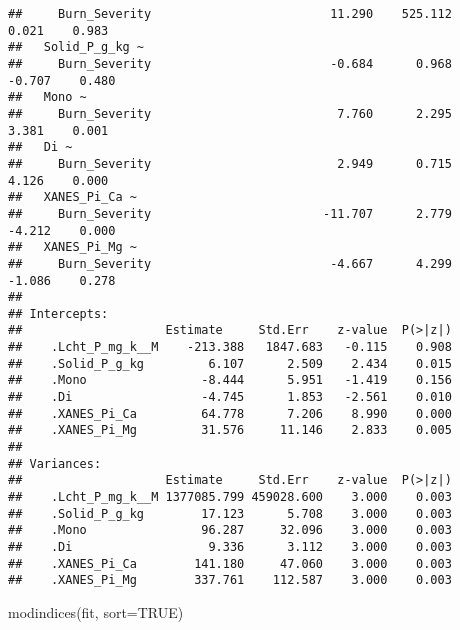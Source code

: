 \documentclass[
]{article}
\newenvironment{Shaded}{\begin{snugshade}}{\end{snugshade}}
\newcommand{\AttributeTok}[1]{\textcolor[rgb]{0.77,0.63,0.00}{#1}}
\newcommand{\ConstantTok}[1]{\textcolor[rgb]{0.00,0.00,0.00}{#1}}
\newcommand{\FunctionTok}[1]{\textcolor[rgb]{0.00,0.00,0.00}{#1}}
\newcommand{\NormalTok}[1]{#1}
\begin{document}
\begin{verbatim}
##     Burn_Severity                         11.290    525.112    0.021    0.983
##   Solid_P_g_kg ~                                                             
##     Burn_Severity                         -0.684      0.968   -0.707    0.480
##   Mono ~                                                                     
##     Burn_Severity                          7.760      2.295    3.381    0.001
##   Di ~                                                                       
##     Burn_Severity                          2.949      0.715    4.126    0.000
##   XANES_Pi_Ca ~                                                              
##     Burn_Severity                        -11.707      2.779   -4.212    0.000
##   XANES_Pi_Mg ~                                                              
##     Burn_Severity                         -4.667      4.299   -1.086    0.278
## 
## Intercepts:
##                    Estimate     Std.Err    z-value  P(>|z|)
##    .Lcht_P_mg_k__M    -213.388   1847.683   -0.115    0.908
##    .Solid_P_g_kg         6.107      2.509    2.434    0.015
##    .Mono                -8.444      5.951   -1.419    0.156
##    .Di                  -4.745      1.853   -2.561    0.010
##    .XANES_Pi_Ca         64.778      7.206    8.990    0.000
##    .XANES_Pi_Mg         31.576     11.146    2.833    0.005
## 
## Variances:
##                    Estimate     Std.Err    z-value  P(>|z|)
##    .Lcht_P_mg_k__M 1377085.799 459028.600    3.000    0.003
##    .Solid_P_g_kg        17.123      5.708    3.000    0.003
##    .Mono                96.287     32.096    3.000    0.003
##    .Di                   9.336      3.112    3.000    0.003
##    .XANES_Pi_Ca        141.180     47.060    3.000    0.003
##    .XANES_Pi_Mg        337.761    112.587    3.000    0.003
\end{verbatim}

\begin{Shaded}
\begin{Highlighting}[]
\FunctionTok{modindices}\NormalTok{(fit, }\AttributeTok{sort=}\ConstantTok{TRUE}\NormalTok{)}
\end{Highlighting}
\end{Shaded}
\end{document}
